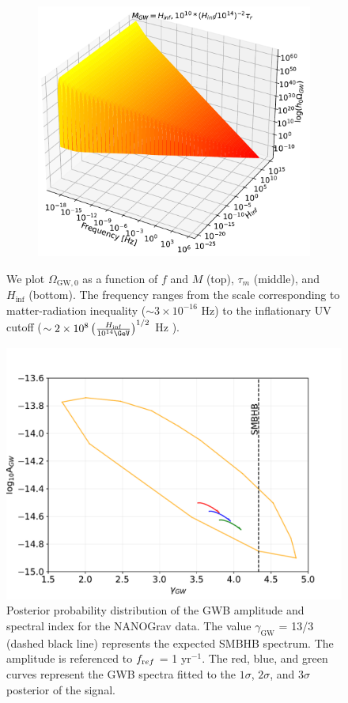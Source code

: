 \begin{figure}[ht!]
\begin{subfigure}{.5\textwidth}
  \includegraphics[width=.82\linewidth]{fig/fig4c.pdf}  
  \label{fig:contour-c}
\end{subfigure}
\caption{We plot $\Omega_{\text{GW},0}$ as a function of $f$ and $M$ (top), $\tau_m$ (middle), and $H_{\inf}$ (bottom). The frequency ranges from the scale corresponding to matter-radiation inequality ($\sim 3\times10^{-16}$ Hz) to the inflationary UV cutoff ($\sim 2\times 10^8\left(\frac{H_{\inf}}{10^{14} \GeV}\right)^{1/2}$ Hz \cite{Fujita:2018}).} 
\label{fig:contours}
\end{figure}


\begin{figure}[ht]
    \includegraphics[width=\linewidth]{fig/fig9.pdf}
    \caption{Posterior probability distribution of the GWB amplitude and spectral index for the NANOGrav data. The value $\gamma_\text{GW}$ = 13/3 (dashed black line) represents the expected SMBHB spectrum. The amplitude is referenced to $f_{\text ref}$ = 1 yr$^{-1}$. The red, blue, and green curves represent the GWB spectra fitted to the $1\sigma$, $2\sigma$, and $3\sigma$ posterior of the signal.}
    \label{fig:amp_spec}
\end{figure}

